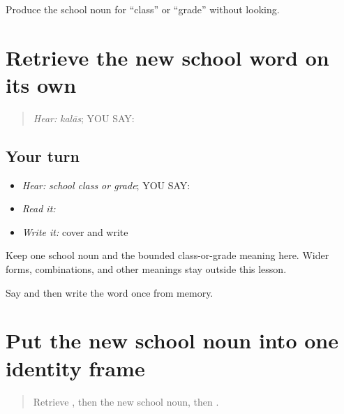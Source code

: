 \begin{tcolorbox}[breakable,colback=teal!4,colframe=teal!35!black,title={Before you move on}]
Produce the school noun for “class” or “grade” without looking.
\end{tcolorbox}
\section[\texorpdfstring{\pa{ਕਲਾਸ} (kalaas)}{ਕਲਾਸ (kalaas)}]{Retrieve the new school word on its own}

\label{lesson:PA-C201-class-review}



\begin{quote}
\emph{Hear:} \emph{kalās}; YOU SAY: \textbf{}
\end{quote}

\subsection*{Your turn}
\begin{itemize}
\raggedright
  \item \emph{Hear:} \emph{school class or grade}; YOU SAY: \textbf{}
  \item \emph{Read it:} \textbf{}
  \item \emph{Write it:} cover and write \textbf{}
\end{itemize}

\begin{grammarlens}[title={Grammar Lens}]
Keep one school noun and the bounded class-or-grade meaning here. Wider forms, combinations, and other meanings stay outside this lesson.
\end{grammarlens}

\begin{tcolorbox}[breakable,colback=teal!4,colframe=teal!35!black,title={Before you move on}]
Say and then write the word once from memory.
\end{tcolorbox}
\section[\texorpdfstring{\pa{ਇਹ} \pa{ਕਲਾਸ} \pa{ਹੈ} (eh kalaas hai)}{ਇਹ ਕਲਾਸ ਹੈ (eh kalaas hai)}]{Put the new school noun into one identity frame}

\label{lesson:PA-C201-class-label}



\begin{quote}
Retrieve \textbf{}, then the new school noun, then \textbf{}.
\end{quote}

